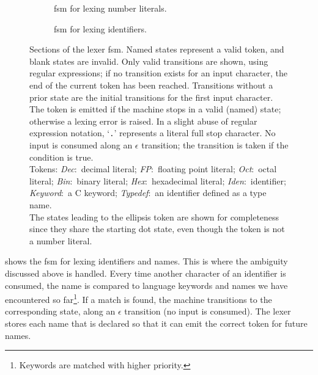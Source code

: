 \documentclass[00-main.tex]{subfiles}
\begin{document}
\begin{figure}[p]
  \begin{subfigure}[t]{\textwidth}
    \centering
    \caption{\Gls{fsm} for lexing number literals.}%
    \label{subfig:lexer fsm numbers}
  \end{subfigure}
  \par\vspace{2\bigskipamount}
  \begin{subfigure}[t]{\textwidth}
    \centering
    \caption{\Gls{fsm} for lexing identifiers.}%
    \label{subfig:lexer fsm identifiers}
  \end{subfigure}
  \caption{
    \protect{}Sections of the lexer \gls{fsm}.
    Named states represent a valid token, and blank states are invalid.
    Only valid transitions are shown, using regular expressions; if no transition exists for an input character, the end of the current token has been reached.
    Transitions without a prior state are the initial transitions for the first input character.
    The token is emitted if the machine stops in a valid (named) state; otherwise a lexing error is raised.
    In a slight abuse of regular expression notation, `\texttt{.}' represents a literal full stop character.
    No input is consumed along an $\epsilon$ transition; the transition is taken if the condition is true. \\
    Tokens: \emph{Dec}:~decimal literal; \emph{FP}:~floating point literal; \emph{Oct}:~octal literal; \emph{Bin}:~binary literal; \emph{Hex}:~hexadecimal literal; \emph{Iden}:~identifier; \emph{Keyword}:~a C keyword; \emph{Typedef}\!:~an identifier defined as a type name. \\
    The states leading to the ellipsis token are shown for completeness since they share the starting dot state, even though the token is not a number literal.
  }%
  \label{fig:lexer fsm}
\end{figure}

 shows the \gls{fsm} for lexing identifiers and  names.
This is where the ambiguity discussed above is handled.
  Every time another character of an identifier is consumed, the name is compared to language keywords and  names we have encountered so far\footnote{Keywords are matched with higher priority.}.
  If a match is found, the machine transitions to the corresponding state, along an $\epsilon$ transition (no input is consumed).
The lexer stores each  name that is declared so that it can emit the correct token for future names.
\end{document}
